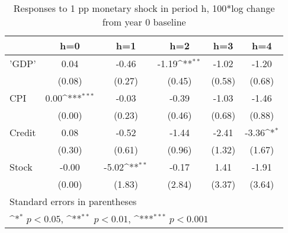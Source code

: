 \begin{table}[htbp]\centering
\def\sym#1{\ifmmode^{#1}\else\(^{#1}\)\fi}
\caption{Responses to 1 pp monetary shock in period h, 100*log change from year 0 baseline}
\begin{tabular}{l*{5}{c}}
\hline\hline
            &\multicolumn{1}{c}{h=0}&\multicolumn{1}{c}{h=1}&\multicolumn{1}{c}{h=2}&\multicolumn{1}{c}{h=3}&\multicolumn{1}{c}{h=4}\\
\hline
'GDP'       &        0.04         &       -0.46         &       -1.19\sym{**} &       -1.02         &       -1.20         \\
            &      (0.08)         &      (0.27)         &      (0.45)         &      (0.58)         &      (0.68)         \\
[1em]
CPI         &        0.00\sym{***}&       -0.03         &       -0.39         &       -1.03         &       -1.46         \\
            &      (0.00)         &      (0.23)         &      (0.46)         &      (0.68)         &      (0.88)         \\
[1em]
Credit      &        0.08         &       -0.52         &       -1.44         &       -2.41         &       -3.36\sym{*}  \\
            &      (0.30)         &      (0.61)         &      (0.96)         &      (1.32)         &      (1.67)         \\
[1em]
Stock       &       -0.00         &       -5.02\sym{**} &       -0.17         &        1.41         &       -1.91         \\
            &      (0.00)         &      (1.83)         &      (2.84)         &      (3.37)         &      (3.64)         \\
\hline\hline
\multicolumn{6}{l}{\footnotesize Standard errors in parentheses}\\
\multicolumn{6}{l}{\footnotesize \sym{*} \(p<0.05\), \sym{**} \(p<0.01\), \sym{***} \(p<0.001\)}\\
\end{tabular}
\end{table}

